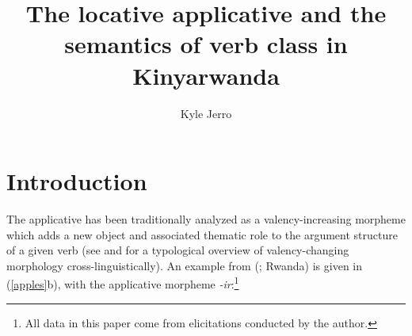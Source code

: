 \documentclass[output=paper]{langsci/langscibook}
\title{The locative applicative and the semantics of verb class in Kinyarwanda}
\author{%
 Kyle Jerro \affiliation{University of Texas at Austin } 
}
\begin{document}
\renewcommand{\comment}{\bf\color{blue}}
\newcommand{\p}{\leavevmode\llap{(}}
\newcommand{\odd}{\leavevmode\llap{\#}}
\newcommand{\odder}{\leavevmode\llap{?\#}}
\newcommand{\q}{\leavevmode\llap{?}}
\newcommand{\hm}{\footnotesize\leavevmode\llap{?(?)}}
\newcommand{\qq}{\leavevmode\llap{??}}
\newcommand{\bad}{\leavevmode\llap{*}}
\newcommand{\huh}{\leavevmode\llap{?*}}

\def\emdash{\hbox{~--\ }}
\def\endash{\hbox{--}}




 
 
 



 
\section{Introduction}%

 The applicative has been traditionally analyzed as a valency-increasing morpheme which adds a new object and associated thematic role to the argument structure of a given verb (see \citealt{dixon:1997} and \citealt{peterson:2007} for a typological overview of valency-changing morphology cross-linguistically). An example from  (; Rwanda) is given in (\ref{apples}b), with the applicative morpheme \emph{-ir}:\footnote{All  data in this paper come from elicitations conducted by the author.}
\end{document}
